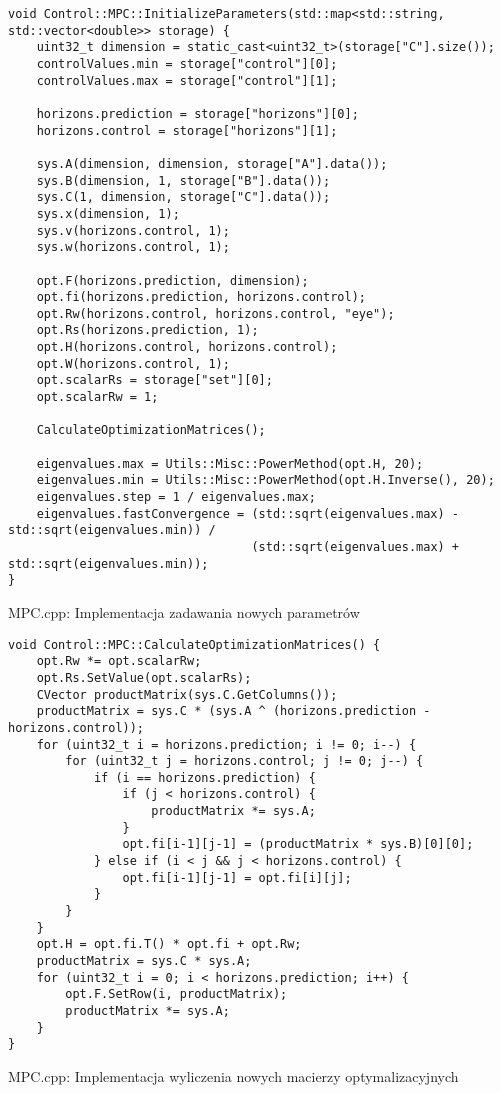 \begin{listing}[htb]
\begin{verbatim}
void Control::MPC::InitializeParameters(std::map<std::string, std::vector<double>> storage) {
    uint32_t dimension = static_cast<uint32_t>(storage["C"].size());
    controlValues.min = storage["control"][0];
    controlValues.max = storage["control"][1];

    horizons.prediction = storage["horizons"][0];
    horizons.control = storage["horizons"][1];

    sys.A(dimension, dimension, storage["A"].data());
    sys.B(dimension, 1, storage["B"].data());
    sys.C(1, dimension, storage["C"].data());
    sys.x(dimension, 1);
    sys.v(horizons.control, 1);
    sys.w(horizons.control, 1);

    opt.F(horizons.prediction, dimension);
    opt.fi(horizons.prediction, horizons.control);
    opt.Rw(horizons.control, horizons.control, "eye");
    opt.Rs(horizons.prediction, 1);
    opt.H(horizons.control, horizons.control);
    opt.W(horizons.control, 1);
    opt.scalarRs = storage["set"][0];
    opt.scalarRw = 1;

    CalculateOptimizationMatrices();

    eigenvalues.max = Utils::Misc::PowerMethod(opt.H, 20);
    eigenvalues.min = Utils::Misc::PowerMethod(opt.H.Inverse(), 20);
    eigenvalues.step = 1 / eigenvalues.max;
    eigenvalues.fastConvergence = (std::sqrt(eigenvalues.max) - std::sqrt(eigenvalues.min)) /
                                  (std::sqrt(eigenvalues.max) + std::sqrt(eigenvalues.min));
}
\end{verbatim}
\caption{MPC.cpp: Implementacja zadawania nowych parametrów}
\label{lst:parameters_cpp}
\end{listing}

\begin{listing}[htb]
\begin{verbatim}
void Control::MPC::CalculateOptimizationMatrices() {
    opt.Rw *= opt.scalarRw;
    opt.Rs.SetValue(opt.scalarRs);
    CVector productMatrix(sys.C.GetColumns());
    productMatrix = sys.C * (sys.A ^ (horizons.prediction - horizons.control));
    for (uint32_t i = horizons.prediction; i != 0; i--) {
        for (uint32_t j = horizons.control; j != 0; j--) {
            if (i == horizons.prediction) {
                if (j < horizons.control) {
                    productMatrix *= sys.A;
                }
                opt.fi[i-1][j-1] = (productMatrix * sys.B)[0][0];
            } else if (i < j && j < horizons.control) {
                opt.fi[i-1][j-1] = opt.fi[i][j];
            }
        }
    }
    opt.H = opt.fi.T() * opt.fi + opt.Rw;
    productMatrix = sys.C * sys.A;
    for (uint32_t i = 0; i < horizons.prediction; i++) {
        opt.F.SetRow(i, productMatrix);
        productMatrix *= sys.A;
    }
}
\end{verbatim}
\caption{MPC.cpp: Implementacja wyliczenia nowych macierzy optymalizacyjnych}
\label{lst:opt_cpp}
\end{listing}

